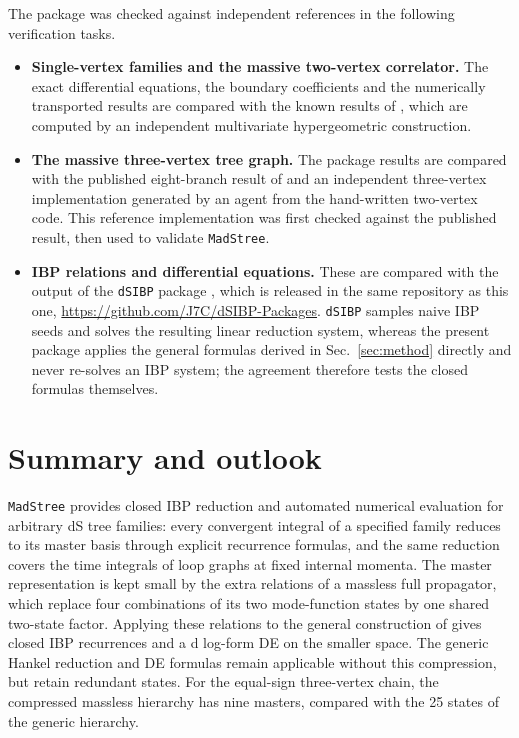 \documentclass[11pt,a4paper]{article}
\numberwithin{table}{section}
\begin{document}
The package was checked against independent references in the following verification tasks.

\begin{itemize}
  \item \textbf{Single-vertex families and the massive two-vertex correlator.} The exact
        differential equations, the boundary coefficients and the numerically transported results
        are compared with the known results of \cite{Chen:2024glu}, which are computed by an
        independent multivariate hypergeometric construction.
  \item \textbf{The massive three-vertex tree graph.} The package results are compared with the
        published eight-branch result of \cite{Xianyu:2023ytd} and an independent three-vertex
        implementation generated by an agent from the hand-written two-vertex code. This reference
        implementation was first checked against the published result, then used to validate
        \texttt{MadStree}.
  \item \textbf{IBP relations and differential equations.} These are compared with the output of the
        \texttt{dSIBP} package \cite{dSIBP:inPreparation}, which is released in the same repository
        as this one, \url{https://github.com/J7C/dSIBP-Packages}. \texttt{dSIBP} samples naive IBP
        seeds and solves the resulting linear reduction system, whereas the present package applies
        the general formulas derived in Sec.~\ref{sec:method} directly and never re-solves an IBP
        system; the agreement therefore tests the closed formulas themselves.
\end{itemize}

\section{Summary and outlook}
\label{sec:summary}

\texttt{MadStree} provides closed IBP reduction and automated numerical evaluation for arbitrary
dS tree families: every convergent integral of a specified family reduces to its master basis through
explicit recurrence formulas, and the same reduction covers the time integrals of loop graphs
at fixed internal momenta. The master representation is kept small by the extra relations of a
massless full propagator, which replace four combinations of its two mode-function states
by one shared two-state factor. Applying these relations to the general construction of
\cite{Chen:2023iix} gives closed IBP recurrences and a d log-form DE on the smaller space.
The generic Hankel reduction and DE formulas remain applicable without this compression, but retain redundant
states. For the equal-sign three-vertex chain, the compressed massless hierarchy has nine masters,
compared with the 25 states of the generic hierarchy.
\end{document}
